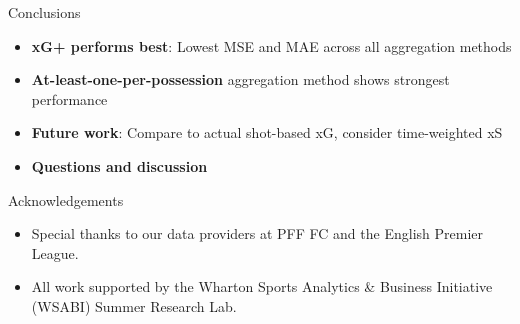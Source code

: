 \documentclass{beamer}
\begin{document}
\begin{frame}{Conclusions}
\begin{itemize}
\item \textbf{xG+ performs best}: Lowest MSE and MAE across all aggregation methods
\item \textbf{At-least-one-per-possession} aggregation method shows strongest performance
\item \textbf{Future work}: Compare to actual shot-based xG, consider time-weighted xS
\item \textbf{Questions and discussion}
\end{itemize}
\end{frame}

\begin{frame}{Acknowledgements}
\begin{itemize}
\item Special thanks to our data providers at PFF FC and the English Premier League.
\item All work supported by the Wharton Sports Analytics \& Business Initiative (WSABI) Summer Research Lab.
\end{itemize}
\end{frame}
\end{document}
